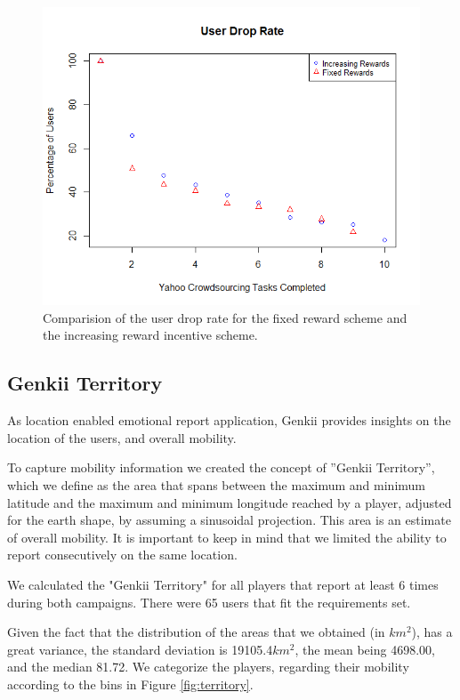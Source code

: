 \documentclass[letterpaper]{article}
\begin{document}
\begin{figure}[htb]
	\begin{center}
		\includegraphics[width=1\linewidth]{images/UserDropRate}
		\caption{Comparision of the user drop rate for the fixed reward scheme and the increasing reward incentive scheme.\label{fig:UserDropRate}}
	\end{center}
\end{figure}

\subsection{Genkii Territory}

As location enabled emotional report application, Genkii provides insights on the location of the users, and overall mobility.

To capture mobility information we created the concept of ''Genkii Territory'', which we define as the area that spans between the maximum and minimum latitude and the maximum and minimum longitude reached by a player, adjusted for the earth shape, by assuming a sinusoidal projection. This area is an estimate of overall mobility.
It is important to keep in mind that we limited the ability to report consecutively on the same location.

We calculated the "Genkii Territory" for all players that report at least 6 times during both campaigns. There were 65 users that fit the requirements set.

Given the fact that the distribution of the areas that we obtained (in $km^2$),
has a great variance, the standard deviation is 19105.4$km^2$, the mean being 4698.00, and the median 81.72. We categorize the players, regarding their mobility according to the bins in Figure \ref{fig:territory}.
\end{document}
